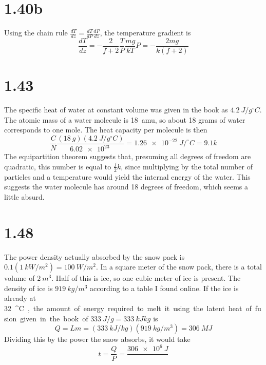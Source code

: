 \documentclass{article}
\begin{document}
\section*{1.40b}
Using the chain rule $\frac{dT}{dz}=\frac{dT}{dP}\frac{dP}{dz}$, the temperature gradient is
\[\frac{dT}{dz}=-\frac{2}{f+2}\frac{T}{P}\frac{mg}{kT}P=-\frac{2mg}{k(f+2)}\]

\section*{1.43}
The specific heat of water at constant volume was given in the book as $\SI{4.2}{J/g^\circ C }$. The atomic mass of a water molecule is \SI{18}{amu}, so about 18 grams of water corresponds to one mole. The heat capacity per molecule is then
\[\frac{C}{N}\frac{(\SI{18}{g})(\SI{4.2}{J/g^\circ C})}{\SI{6.02e23}{}}=\SI{1.26e-22}{J/^\circ C}=9.1k\]
The equipartition theorem suggests that, presuming all degrees of freedom are quadratic, this number is equal to $\frac{f}{2}k$, since multiplying by the total number of particles and a temperature would yield the internal energy of the water. This suggests the water molecule has around 18 degrees of freedom, which seems a little absurd.

\section*{1.48}
The power density actually absorbed by the snow pack is $0.1(\SI{1}{kW/m^2})=\SI{100}{W/m^2}$. In a square meter of the snow pack, there is a total volume of $\SI{2}{m^3}$. Half of this is ice, so one cubic meter of ice is present. The density of ice is $\SI{919}{kg/m^3}$ according to a table I found online. If the ice is already at \SI{32}{^\circ C}, the amount of energy required to melt it using the latent heat of fusion given in the book of $\SI{333}{J/g}=\SI{333}{kJ}{kg}$ is
\[Q=Lm={(\SI{333}{kJ/kg})}{(\SI{919}{kg/m^3})}=\SI{306}{MJ}\]
Dividing this by the power the snow absorbs, it would take
\[t=\frac{Q}{P}=\frac{\SI{306e6}{J}}{\SI{}}\]
\end{document}
